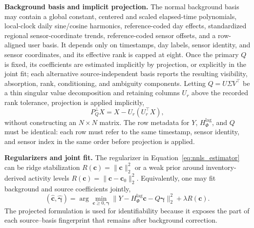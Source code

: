 \noindent\textbf{Background basis and implicit projection.}
The normal background basis may contain a global constant, centered and scaled
elapsed-time polynomials, local-clock daily sine/cosine harmonics,
reference-coded day effects, standardized regional sensor-coordinate trends,
reference-coded sensor offsets, and a row-aligned user basis.  It depends only
on timestamps, day labels, sensor identity, and sensor coordinates, and its
effective rank is capped at eight.  Once the primary \(Q\) is fixed, its
coefficients are estimated implicitly by projection, or explicitly in the joint
fit; each alternative source-independent basis reports the resulting visibility,
absorption, rank, conditioning, and ambiguity components.  Letting
\(Q=U\Sigma V^\top\) be a thin singular value decomposition and retaining
columns \(U_r\) above the recorded rank tolerance, projection is applied
implicitly,
\begin{equation}
P_Q^\perp X=X-U_r(U_r^\top X),
\label{eq:implicit_background_projection}
\end{equation}
without constructing an \(N\times N\) matrix.  The row metadata for \(Y\),
\(H_\Phi^{\mathrm{lag}}\), and \(Q\) must be identical: each row must refer to the
same timestamp, sensor identity, and sensor index in the same order before
projection is applied.

\noindent\textbf{Regularizers and joint fit.}
The regularizer in Equation~\ref{eq:nnls_estimator} can be ridge stabilization
\(R(\mathbf c)=\|\mathbf c\|_2^2\) or a weak prior around inventory-derived
activity levels \(R(\mathbf c)=\|\mathbf c-\mathbf c_0\|_2^2\).  Equivalently, one
may fit background and source coefficients jointly,
\begin{equation}
(\widehat{\mathbf c},\widehat{\boldsymbol\gamma})
=\arg\min_{\mathbf c\ge 0,\boldsymbol\gamma}
\|Y-H_{\Phi}^{\mathrm{lag}}\mathbf c-Q\boldsymbol\gamma\|_2^2
+\lambda R(\mathbf c).
\label{eq:joint_fit}
\end{equation}
The projected formulation is used for identifiability because it exposes the
part of each source--basis fingerprint that remains after background correction.

